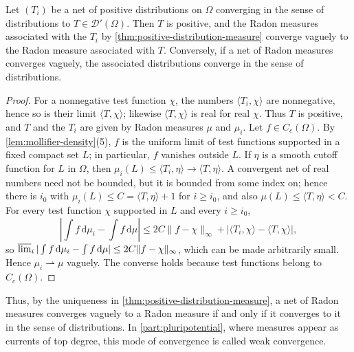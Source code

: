 \begin{proposition}\label{prop:positive-distribution-convergence}
Let $(T_i)$ be a net of positive distributions on $\Omega$ converging in the sense of distributions to $T\in\mathcal D'(\Omega)$. Then $T$ is positive, and the Radon measures associated with the $T_i$ by \cref{thm:positive-distribution-measure} converge vaguely to the Radon measure associated with $T$. Conversely, if a net of Radon measures converges vaguely, the associated distributions converge in the sense of distributions.
\end{proposition}
\begin{proof}
For a nonnegative test function $\chi$, the numbers $\langle T_i,\chi\rangle$ are nonnegative, hence so is their limit $\langle T,\chi\rangle$; likewise $\langle T,\chi\rangle$ is real for real $\chi$. Thus $T$ is positive, and $T$ and the $T_i$ are given by Radon measures $\mu$ and $\mu_i$. Let $f\in C_c(\Omega)$. By \cref{lem:mollifier-density}(5), $f$ is the uniform limit of test functions supported in a fixed compact set $L$; in particular, $f$ vanishes outside $L$. If $\eta$ is a smooth cutoff function for $L$ in $\Omega$, then $\mu_i(L)\leq\langle T_i,\eta\rangle\to\langle T,\eta\rangle$. A convergent net of real numbers need not be bounded, but it is bounded from some index on; hence there is $i_0$ with $\mu_i(L)\leq C=\langle T,\eta\rangle+1$ for $i\geq i_0$, and also $\mu(L)\leq\langle T,\eta\rangle<C$. For every test function $\chi$ supported in $L$ and every $i\geq i_0$,
\[
 \left|\int f\,\mathrm d\mu_i-\int f\,\mathrm d\mu\right|\leq2C\|f-\chi\|_\infty+|\langle T_i,\chi\rangle-\langle T,\chi\rangle|,
\]
so $\varlimsup_i|\int f\,\mathrm d\mu_i-\int f\,\mathrm d\mu|\leq2C\|f-\chi\|_\infty$, which can be made arbitrarily small. Hence $\mu_i\rightharpoonup\mu$ vaguely. The converse holds because test functions belong to $C_c(\Omega)$.
\end{proof}

Thus, by the uniqueness in \cref{thm:positive-distribution-measure}, a net of Radon measures converges vaguely to a Radon measure if and only if it converges to it in the sense of distributions. In \cref{part:pluripotential}, where measures appear as currents of top degree, this mode of convergence is called weak convergence.

